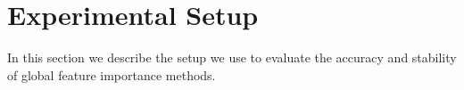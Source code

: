 


\vspace{-.2cm}
\section{Experimental Setup} \label{sec:exp_setup}
\vspace{-.2cm}
In this section we describe the setup we use to evaluate the accuracy and stability of global feature importance methods.


